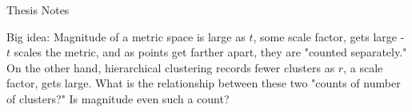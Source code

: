 \documentclass{article}
\begin{document}
\begin{center}{\Large Thesis Notes}\\ \vspace{1 ex} \end{center}


\vspace{2 ex}
\noindent

Big idea: Magnitude of a metric space is large as $t$, some scale factor, gets large - $t$ scales the metric, and as points get farther apart, they are "counted separately." On the other hand, hierarchical clustering records fewer clusters as $r$, a scale factor, gets large. What is the relationship between these two "counts of number of clusters?" Is magnitude even such a count?
\end{document}
